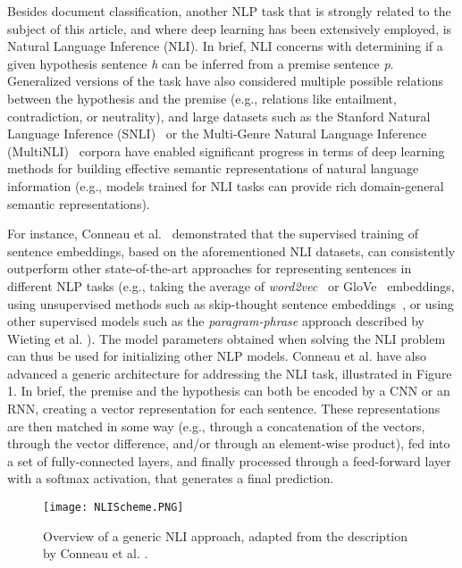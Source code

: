 Besides document classification, another NLP task that is strongly related to the subject of this article, and where deep learning has been extensively employed, is Natural Language Inference (NLI). In brief, NLI concerns with determining if a given  hypothesis sentence \textit{h} can be inferred from a premise sentence \textit{p}. Generalized versions of the task have also considered multiple possible relations between the hypothesis and the premise (e.g., relations like entailment, contradiction, or neutrality), and large datasets such as the Stanford Natural Language Inference (SNLI)~\cite{snli} or the 
Multi-Genre Natural Language Inference (MultiNLI)~\cite{inference} corpora have enabled significant progress in terms of deep learning methods for building effective semantic representations of natural language information (e.g., models trained for NLI tasks can provide rich domain-general semantic representations).

For instance, Conneau et al.~\cite{supervised} demonstrated that the supervised training of sentence embeddings, based on the aforementioned NLI datasets, can consistently outperform other state-of-the-art approaches for representing sentences in different NLP tasks (e.g., taking the average of \textit{word2vec}~\cite{word2vec} or GloVe~\cite{glove} embeddings, using unsupervised methods such as skip-thought sentence embeddings~\cite{skip}, or using other supervised models such as the \textit{paragram-phrase} approach described by Wieting et al. \cite{paragram}). The model parameters obtained when solving the NLI problem can thus be used for initializing other NLP models. Conneau et al. have also advanced a generic architecture for addressing the NLI task, illustrated in Figure 1. In brief, the premise and the hypothesis can both be encoded by a CNN or an RNN, creating a vector representation for each sentence. These representations are then matched in some way (e.g., through a concatenation of the vectors, through the vector difference, and/or through an element-wise product), fed into a set of fully-connected layers, and finally processed through a feed-forward layer with a softmax activation, that generates a final prediction.

\begin{figure}[t]
  \begin{center}
  \texttt{[image: NLIScheme.PNG]}
  \caption{Overview of a generic NLI approach, adapted from the description by Conneau et al. \cite{supervised}.}
  \label{fig:nli}
  \end{center}
\end{figure}

